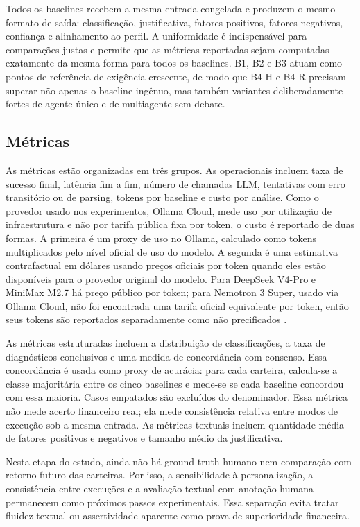 Todos os baselines recebem a mesma entrada congelada e produzem o mesmo
formato de saída: classificação, justificativa, fatores positivos,
fatores negativos, confiança e alinhamento ao perfil. A uniformidade é
indispensável para comparações justas e permite que as métricas
reportadas sejam computadas exatamente da mesma forma para todos os
baselines. B1, B2 e B3 atuam como pontos de referência de exigência
crescente, de modo que B4-H e B4-R precisam superar não apenas o
baseline ingênuo, mas também variantes deliberadamente fortes de agente
único e de multiagente sem debate.

\subsection{Métricas}

As métricas estão organizadas em três grupos. As operacionais incluem
taxa de sucesso final, latência fim a fim, número de chamadas LLM,
tentativas com erro transitório ou de parsing, tokens por baseline e
custo por análise. Como o provedor usado nos experimentos, Ollama Cloud,
mede uso por utilização de infraestrutura e não por tarifa pública fixa
por token, o custo é reportado de duas formas. A primeira é um proxy de
uso no Ollama, calculado como tokens multiplicados pelo nível oficial de
uso do modelo. A segunda é uma estimativa contrafactual em dólares usando
preços oficiais por token quando eles estão disponíveis para o provedor
original do modelo. Para DeepSeek V4-Pro e MiniMax M2.7 há preço público
por token; para Nemotron 3 Super, usado via Ollama Cloud, não foi
encontrada uma tarifa oficial equivalente por token, então seus tokens
são reportados separadamente como não precificados
\citep{deepseekpricing2026,minimaxpricing2026,ollamapricing2026}.

As métricas estruturadas incluem a distribuição de classificações,
a taxa de diagnósticos conclusivos e uma medida de concordância com
consenso. Essa concordância é usada como proxy de acurácia: para cada
carteira, calcula-se a classe majoritária entre os cinco baselines e
mede-se se cada baseline concordou com essa maioria. Casos empatados são
excluídos do denominador. Essa métrica não mede acerto financeiro real;
ela mede consistência relativa entre modos de execução sob a mesma
entrada. As métricas textuais incluem quantidade média de fatores
positivos e negativos e tamanho médio da justificativa.

Nesta etapa do estudo, ainda não há ground truth humano nem comparação
com retorno futuro das carteiras. Por isso, a sensibilidade à
personalização, a consistência entre execuções e a avaliação textual com
anotação humana permanecem como próximos passos experimentais. Essa
separação evita tratar fluidez textual ou assertividade aparente como
prova de superioridade financeira.

